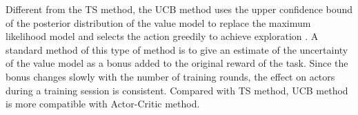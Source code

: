 Different from the TS method, the UCB method uses the upper confidence bound of the posterior distribution of the value model to replace the maximum likelihood model and selects the action greedily to achieve exploration \cite{auer2002finite,audibert2009exploration}. A standard method of this type of method is to give an estimate of the uncertainty of the value model as a bonus added to the original reward of the task. Since the bonus changes slowly with the number of training rounds, the effect on actors during a training session is consistent. Compared with TS method, UCB method is more compatible with Actor-Critic method.